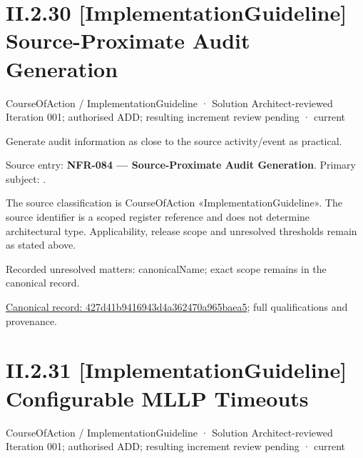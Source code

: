\section*{II.2.30 [ImplementationGuideline] Source-Proximate Audit Generation}
\label{navigation:II.2.30}

\label{element:427d41b9416943d4a362470a965baea5}
{\small CourseOfAction / ImplementationGuideline · Solution Architect-reviewed Iteration 001; authorised ADD; resulting increment review pending · current}\par

Generate audit information as close to the source activity/event as practical.



Source entry: \textbf{NFR-084 — Source-Proximate Audit Generation}. Primary subject: \texttt{}.



The source classification is CourseOfAction «ImplementationGuideline». The source identifier is a scoped register reference and does not determine architectural type. Applicability, release scope and unresolved thresholds remain as stated above.


{\small Recorded unresolved matters: canonicalName; exact scope remains in the canonical record.}\par
{\footnotesize \href{../../../../continuum/strategy/course-of-action/implementation-guideline/427d41b9416943d4a362470a965baea5.md}{Canonical record: 427d41b9416943d4a362470a965baea5}; full qualifications and provenance.}\par
\section*{II.2.31 [ImplementationGuideline] Configurable MLLP Timeouts}
\label{navigation:II.2.31}

\label{element:267142b7a01a49c686458b9fc1c8d7b2}
{\small CourseOfAction / ImplementationGuideline · Solution Architect-reviewed Iteration 001; authorised ADD; resulting increment review pending · current}\par

